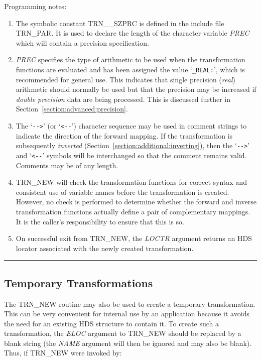 \documentclass[twoside,nolof,11pt]{starlink}
\providecommand{\name}[1]{\small{#1}}
\providecommand{\fortvar}[1]{\emph{#1}}
\providecommand{\exampledone}[0]{\begin{center} \rule{6em}{0.2mm} \end{center}}
\begin{document}
Programming notes:

\begin{enumerate}

\item The symbolic constant \name{TRN\_\_SZPRC} is defined in the include
file \name{TRN\_PAR}.
It is used to declare the length of the character variable \fortvar{PREC}
which will contain a precision specification.

\item \fortvar{PREC} specifies the type of arithmetic to be used when the
transformation functions are evaluated and has been assigned the value
`\verb#_REAL:#', which is recommended for general use.
This indicates that single precision (\emph{real}) arithmetic should normally
be used but that the precision may be increased if \emph{double precision}
data are being processed.
This is discussed further in Section~\ref{section:advanced:precision}.

\item The `\verb#-->#' (or `\verb#<--#') character sequence may be used in
comment strings to indicate the direction of the forward mapping.
If the transformation is subsequently \emph{inverted}
(Section~\ref{section:additional:inverting}), then the `\verb#-->#' and
`\verb#<--#' symbols will be interchanged so that the comment remains valid.
Comments may be of any length.

\item \name{TRN\_NEW} will check the transformation functions for correct
syntax and consistent use of variable names before the transformation is
created.
However, no check is performed to determine whether the forward and inverse
transformation functions actually define a pair of complementary mappings.
It is the caller's responsibility to ensure that this is so.

\item On successful exit from \name{TRN\_NEW}, the \fortvar{LOCTR} argument
returns an \name{HDS} locator associated with the newly created
transformation.

\end{enumerate}
\exampledone


\subsection{Temporary Transformations}

\label{section:simple:temporary}

The \name{TRN\_NEW} routine may also be used to create a temporary
transformation.
This can be very convenient for internal use by an application because it
avoids the need for an existing \name{HDS} structure to contain it.
To create such a transformation, the \fortvar{ELOC} argument to
\name{TRN\_NEW} should be replaced by a blank string (the \fortvar{NAME}
argument will then be ignored and may also be blank).
Thus, if \name{TRN\_NEW} were invoked by:
\end{document}
